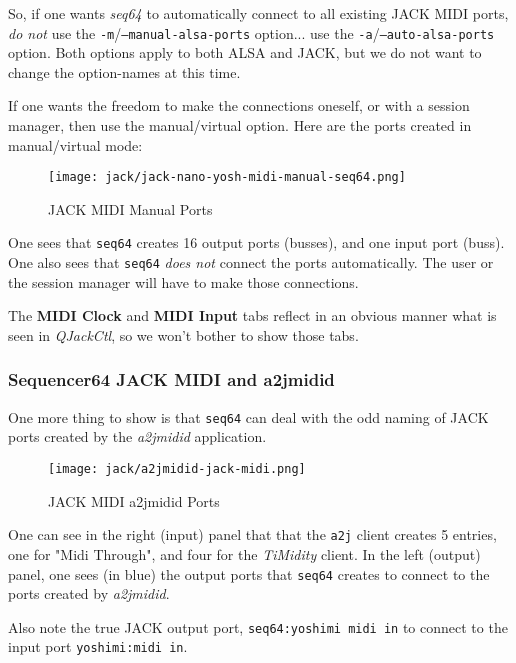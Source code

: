    So, if one wants \textsl{seq64} to automatically connect to all existing
   JACK MIDI ports, \textsl{do not} use the
   \texttt{-m}/\texttt{--manual-alsa-ports} option... use the
   \texttt{-a}/\texttt{--auto-alsa-ports} option.  Both options apply to both
   ALSA and JACK, but we do not want to change the option-names at this time.

   If one wants the freedom to make the connections oneself, or with a session
   manager, then use the manual/virtual option.
   Here are the ports created in manual/virtual mode:

\begin{figure}[H]
   \centering 
   \texttt{[image: jack/jack-nano-yosh-midi-manual-seq64.png]}
   \caption{JACK MIDI Manual Ports}
   \label{fig:seq64_jack_nano_yosh_midi_manual}
\end{figure}

   One sees that \texttt{seq64} creates 16 output ports (busses), and one input
   port (buss).  One also sees that \texttt{seq64} \textsl{does not} connect
   the ports automatically.  The user or the session manager will have to make
   those connections.

   The \textbf{MIDI Clock} and \textbf{MIDI Input} tabs reflect in an obvious
   manner what is seen in \textsl{QJackCtl}, so we won't bother to show those
   tabs.

\subsubsection{Sequencer64 JACK MIDI and a2jmidid}
\label{subsubsec:seq64_jack_midi_a2jmidid}

   One more thing to show is that \texttt{seq64} can deal with the odd naming
   of JACK ports created by the \textsl{a2jmidid} application.

\begin{figure}[H]
   \centering 
   \texttt{[image: jack/a2jmidid-jack-midi.png]}
   \caption{JACK MIDI a2jmidid Ports}
   \label{fig:seq64_a2jmidid_jack_midi}
\end{figure}

   One can see in the right (input) panel that that the \texttt{a2j} client
   creates 5 entries, one for "Midi Through", and four for the
   \textsl{TiMidity} client.
   In the left (output) panel, one sees (in blue) the output
   ports that \texttt{seq64} creates to connect to the ports created by
   \textsl{a2jmidid}.

   Also note the true JACK output port,
   \texttt{seq64:yoshimi midi in} to connect to the input port
   \texttt{yoshimi:midi in}.

